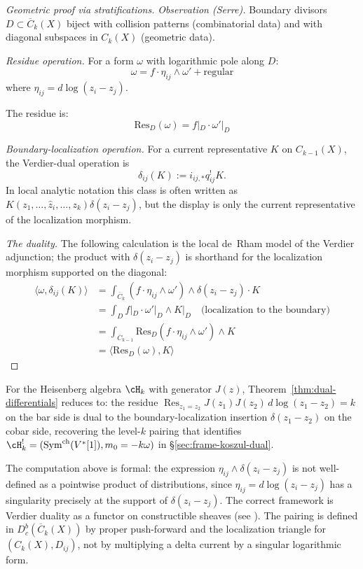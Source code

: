 \begin{proof}[Geometric proof via stratifications]
\emph{Observation \textup{(Serre)}.} Boundary divisors $D \subset \overline{C}_k(X)$ biject with collision patterns (combinatorial data) and with diagonal subspaces in $C_k(X)$ (geometric data).

\emph{Residue operation.}
For a form $\omega$ with logarithmic pole along $D$:
\[\omega = f \cdot \eta_{ij} \wedge \omega' + \text{regular}\]
where $\eta_{ij} = d\log(z_i - z_j)$.

The residue is:
\[\text{Res}_D(\omega) = f|_D \cdot \omega'|_D\]

\emph{Boundary-localization operation.}
For a current representative $K$ on $C_{k-1}(X)$, the Verdier-dual
operation is
\[
\delta_{ij}(K):=i_{ij,*}q_{ij}^{!}K.
\]
In local analytic notation this class is often written as
$K(z_1,\ldots,\widehat z_i,\ldots,z_k)\delta(z_i-z_j)$, but the
display is only the current representative of the localization
morphism.

\emph{The duality.}
The following calculation is the local de~Rham model of the
Verdier adjunction; the product with $\delta(z_i-z_j)$ is shorthand
for the localization morphism supported on the diagonal:
\begin{align*}
\langle \omega, \delta_{ij}(K) \rangle &= \int_{\overline{C}_k} (f \cdot \eta_{ij} \wedge \omega') \wedge \delta(z_i - z_j) \cdot K\\
&= \int_{D} f|_D \cdot \omega'|_D \wedge K|_D \quad \text{(localization to the boundary)}\\
&= \int_{\overline{C}_{k-1}} \text{Res}_D(f \cdot \eta_{ij} \wedge \omega') \wedge K\\
&= \langle \text{Res}_D(\omega), K \rangle
\end{align*}
\end{proof}

\begin{example}\label{ex:dual-diff-heisenberg}
For the Heisenberg algebra $\cH_k$ with generator $J(z)$,
Theorem~\ref{thm:dual-differentials} reduces to:
the residue $\operatorname{Res}_{z_1=z_2} J(z_1) J(z_2)\, d\log(z_1-z_2) = k$
on the bar side is dual to the boundary-localization insertion
$\delta(z_1-z_2)$ on the cobar side, recovering the
level-$k$ pairing that identifies
$\cH_k^!=(\mathrm{Sym}^{\mathrm{ch}}(V^*[1]),m_0=-k\omega)$
in \S\ref{sec:frame-koszul-dual}.
\end{example}

\begin{remark}\label{rem:analytic-framework}
The computation above is formal: the expression
$\eta_{ij} \wedge \delta(z_i - z_j)$ is not well-defined as a
pointwise product of distributions, since
$\eta_{ij}=d\log(z_i-z_j)$ has a singularity precisely at the
support of $\delta(z_i-z_j)$. The correct framework is Verdier
duality as a functor on constructible sheaves
(see \cite[Expos\'e XVIII]{SGA4}). The pairing is defined in
$D^b_c(\overline{C}_k(X))$ by proper push-forward and the
localization triangle for $(C_k(X),D_{ij})$, not by multiplying a
delta current by a singular logarithmic form.
\end{remark}

